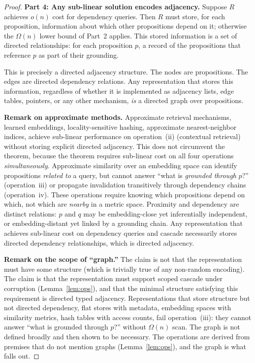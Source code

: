\documentclass[11pt]{article}
\theoremstyle{definition}
\begin{document}
\begin{proof}
\textbf{Part 4: Any sub-linear solution encodes adjacency.}
Suppose $R$ achieves $o(n)$ cost for dependency queries. Then $R$ must
store, for each proposition, information about which other propositions
depend on it; otherwise the $\Omega(n)$ lower bound of Part~2
applies. This stored information is a set of directed relationships: for
each proposition $p$, a record of the propositions that reference $p$ as
part of their grounding.

This is precisely a directed adjacency structure. The nodes are
propositions. The edges are directed dependency relations. Any
representation that stores this information, regardless of whether it
is implemented as adjacency lists, edge tables, pointers, or any other
mechanism, \emph{is} a directed graph over propositions.

\textbf{Remark on approximate methods.}
Approximate retrieval mechanisms, learned embeddings,
locality-sensitive hashing, approximate nearest-neighbor indices,
achieve sub-linear performance on operation~(ii) (contextual retrieval)
without storing explicit directed adjacency. This does not circumvent
the theorem, because the theorem requires sub-linear cost on all four
operations \emph{simultaneously}. Approximate similarity over an
embedding space can identify propositions \emph{related to} a query, but
cannot answer ``what is \emph{grounded through} $p$?'' (operation~iii)
or propagate invalidation transitively through dependency chains
(operation~iv). These operations require knowing which propositions
depend on which, not which are \emph{nearby} in a metric space.
Proximity and dependency are distinct relations: $p$ and $q$ may be
embedding-close yet inferentially independent, or embedding-distant yet
linked by a grounding chain. Any representation that achieves sub-linear
cost on dependency queries and cascade necessarily stores directed
dependency relationships, which is directed adjacency.

\textbf{Remark on the scope of ``graph.''}
The claim is not that the representation must have some structure (which
is trivially true of any non-random encoding). The claim is that the
representation must support scoped cascade under corruption
(Lemma~\ref{lem:ops}), and that the minimal structure satisfying this
requirement is directed typed adjacency. Representations that store
structure but not directed dependency, flat stores with metadata,
embedding spaces with similarity metrics, hash tables with access
counts, fail operation~(iii): they cannot answer ``what is grounded
through $p$?'' without $\Omega(n)$ scan. The graph is not defined
broadly and then shown to be necessary. The operations are derived from
premises that do not mention graphs (Lemma~\ref{lem:ops}), and the
graph is what falls out.


\end{proof}
\end{document}
